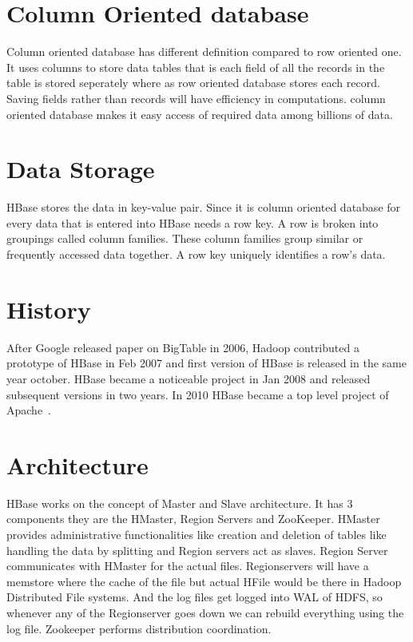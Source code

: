 \section{Column Oriented database}

Column oriented database has different definition compared to row oriented one. 
It uses columns to store data tables that is each field of all the records in 
the table is stored  seperately where as row oriented database stores each 
record. Saving fields rather than records will have efficiency in computations.
column oriented database makes it easy access of required data among billions of 
data. 


 \section{Data Storage}

 HBase stores the data in key-value pair. Since it is column oriented database 
 for every data that is entered into HBase needs a row key. A row is broken into
 groupings called column families. These column families group similar or 
 frequently accessed data together. A row key uniquely identifies a row's data.

\section{History}

 After Google released paper on BigTable in 2006, Hadoop contributed a prototype
of HBase in Feb 2007 and first version of HBase is released in the same year 
october. HBase became a noticeable project in Jan 2008 and released subsequent 
versions in two years. In 2010 HBase became a top level project of 
Apache~\cite{hid-sp18-421-HBase-history}.

\section{Architecture}

HBase works on the concept of Master and Slave architecture. It has 3
components they are the HMaster, Region Servers and ZooKeeper.   HMaster
provides administrative functionalities like creation and deletion of tables
like handling the data by splitting and Region servers act as slaves. Region
Server communicates with HMaster for the actual files. Regionservers will have a
memstore where the cache of the file but actual HFile  would be there in Hadoop
Distributed File systems. And the log files get logged  into WAL of HDFS, so
whenever any of the Regionserver goes down we can rebuild  everything using the
log file. Zookeeper performs distribution coordination.

